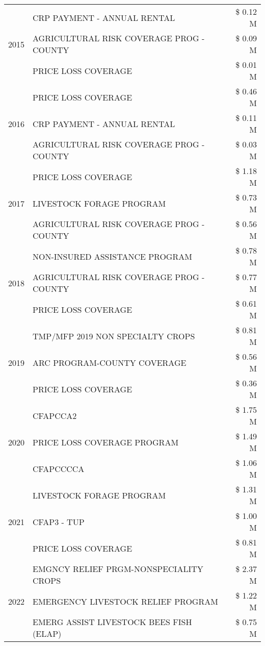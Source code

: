 \begin{tabular}{llr}
\cline{1-3}
\multirow[t]{3}{*}{2015} & CRP PAYMENT - ANNUAL RENTAL & \$ 0.12 M \\
 & AGRICULTURAL RISK COVERAGE PROG - COUNTY & \$ 0.09 M \\
 & PRICE LOSS COVERAGE & \$ 0.01 M \\
\cline{1-3}
\multirow[t]{3}{*}{2016} & PRICE LOSS COVERAGE & \$ 0.46 M \\
 & CRP PAYMENT - ANNUAL RENTAL & \$ 0.11 M \\
 & AGRICULTURAL RISK COVERAGE PROG - COUNTY & \$ 0.03 M \\
\cline{1-3}
\multirow[t]{3}{*}{2017} & PRICE LOSS COVERAGE & \$ 1.18 M \\
 & LIVESTOCK FORAGE PROGRAM & \$ 0.73 M \\
 & AGRICULTURAL RISK COVERAGE PROG - COUNTY & \$ 0.56 M \\
\cline{1-3}
\multirow[t]{3}{*}{2018} & NON-INSURED ASSISTANCE PROGRAM & \$ 0.78 M \\
 & AGRICULTURAL RISK COVERAGE PROG - COUNTY & \$ 0.77 M \\
 & PRICE LOSS COVERAGE & \$ 0.61 M \\
\cline{1-3}
\multirow[t]{3}{*}{2019} & TMP/MFP 2019 NON SPECIALTY CROPS & \$ 0.81 M \\
 & ARC PROGRAM-COUNTY COVERAGE & \$ 0.56 M \\
 & PRICE LOSS COVERAGE & \$ 0.36 M \\
\cline{1-3}
\multirow[t]{3}{*}{2020} & CFAPCCA2 & \$ 1.75 M \\
 & PRICE LOSS COVERAGE PROGRAM & \$ 1.49 M \\
 & CFAPCCCCA & \$ 1.06 M \\
\cline{1-3}
\multirow[t]{3}{*}{2021} & LIVESTOCK FORAGE PROGRAM & \$ 1.31 M \\
 & CFAP3 - TUP & \$ 1.00 M \\
 & PRICE LOSS COVERAGE & \$ 0.81 M \\
\cline{1-3}
\multirow[t]{3}{*}{2022} & EMGNCY RELIEF PRGM-NONSPECIALITY CROPS & \$ 2.37 M \\
 & EMERGENCY LIVESTOCK RELIEF PROGRAM & \$ 1.22 M \\
 & EMERG ASSIST LIVESTOCK BEES FISH (ELAP) & \$ 0.75 M \\
\cline{1-3}
\bottomrule
\end{tabular}
